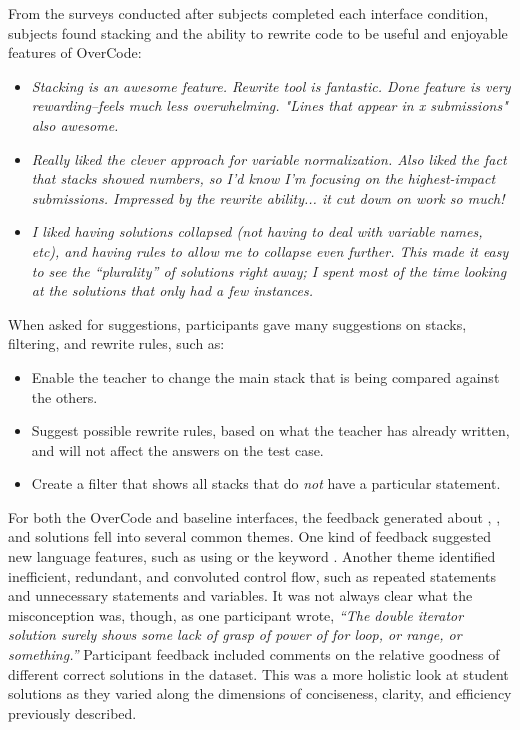 From the surveys conducted after subjects completed each interface condition, subjects found stacking and the ability to rewrite code to be useful and enjoyable features of OverCode:
\begin{itemize}
\item {\it Stacking is an awesome feature. Rewrite tool is fantastic. Done feature is very rewarding--feels much less overwhelming. "Lines that appear in x submissions" also awesome.}

\item {\it Really liked the clever approach for variable normalization. Also liked the fact that stacks showed numbers, so I'd know I'm focusing on the highest-impact submissions. Impressed by the rewrite ability... it cut down on work so much!}

\item {\it I liked having solutions collapsed (not having to deal with variable names, etc), and having rules to allow me to collapse even further. This made it easy to see the ``plurality'' of solutions right away; I spent most of the time looking at the solutions that only had a few instances.}
\end{itemize}

When asked for suggestions, participants gave many suggestions on stacks, filtering, and rewrite rules, such as:
\begin{itemize}
\item Enable the teacher to change the main stack that is being compared against the others.
\item Suggest possible rewrite rules, based on what the teacher has already written, and will not affect the answers on the test case.
\item Create a filter that shows all stacks that do {\it not} have a particular statement.
\end{itemize}

For both the OverCode and baseline interfaces, the feedback generated about , , and  solutions fell into several common themes. One kind of feedback suggested new language features, such as using \codevar{*=} or the keyword . Another theme identified inefficient, redundant, and convoluted control flow, such as repeated statements and unnecessary statements and variables. It was not always clear what the misconception was, though, as one participant wrote, \textit{``The double iterator solution surely shows some lack of grasp of power of for loop, or range, or something.''} Participant feedback included comments on the relative goodness of different correct solutions in the dataset. This was a more holistic look at student solutions as they varied along the dimensions of conciseness, clarity, and efficiency previously described.

